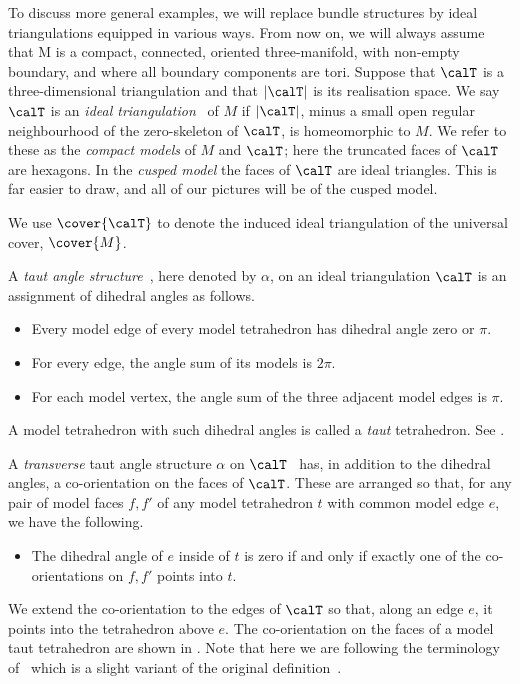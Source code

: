 \documentclass[12pt]{amsart}
\begin{document}
To discuss more general examples, we will replace bundle structures by ideal triangulations equipped in various ways.  From now on, we will always assume that M is a compact, connected, oriented three-manifold, with non-empty boundary, and where all boundary components are tori.  Suppose that $\calT$ is a three-dimensional triangulation and that $|\calT|$ is its realisation space. We say $\calT$ is an \emph{ideal triangulation}~\cite[Section~4.2]{thurston_notes} of $M$ if $|\calT|$, minus a small open regular neighbourhood of the zero-skeleton of $\calT$, is homeomorphic to $M$.  We refer to these as the \emph{compact models} of $M$ and $\calT$; here the truncated faces of $\calT$ are hexagons.  In the \emph{cusped model} the faces of $\calT$ are ideal triangles.  This is far easier to draw, and all of our pictures will be of the cusped model. 

We use $\cover{\calT}$ to denote the induced ideal triangulation of the universal cover, $\cover{M}$. 


A \emph{taut angle structure}~\cite[Definition~1.1]{HRST11}, here denoted by $\alpha$, on an ideal triangulation $\calT$ is an assignment of dihedral angles as follows.
\begin{itemize}
\item
Every model edge of every model tetrahedron has dihedral angle zero or $\pi$.
\item
For every edge, the angle sum of its models is $2\pi$.
\item
For each model vertex, the angle sum of the three adjacent model edges is $\pi$.
\end{itemize}
A model tetrahedron with such dihedral angles is called a \emph{taut} tetrahedron.  See .  

A \emph{transverse} taut angle structure $\alpha$ on $\calT$~\cite[Definition~1.2]{HRST11} has, in addition to the dihedral angles, a co-orientation on the faces of $\calT$.  These are arranged so that, for any pair of model faces $f, f'$ of any model tetrahedron $t$ with common model edge $e$, we have the following.
\begin{itemize}
\item 
The dihedral angle of $e$ inside of $t$ is zero if and only if exactly one of the co-orientations on $f, f'$ points into $t$.
\end{itemize}
We extend the co-orientation to the edges of $\calT$ so that, along an edge $e$, it points into the tetrahedron above $e$.  The co-orientation on the faces of a model taut tetrahedron are shown in .  Note that here we are following the terminology of~\cite{HRST11} which is a slight variant of the original definition~\cite[page~370]{Lackenby00}.
\end{document}
